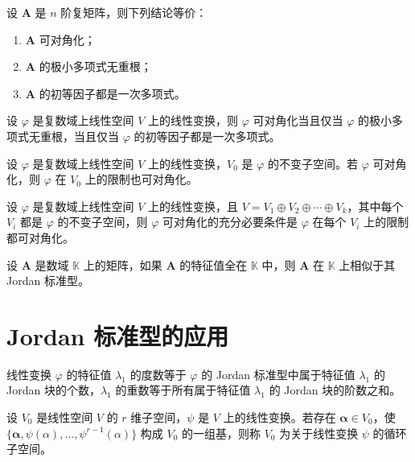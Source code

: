 \begin{corollary}
    设 $\bm{A}$ 是 $n$ 阶复矩阵，则下列结论等价：
    \begin{enumerate}
        \item $\bm{A}$ 可对角化；
        \item $\bm{A}$ 的极小多项式无重根；
        \item $\bm{A}$ 的初等因子都是一次多项式。
    \end{enumerate}
\end{corollary}

\begin{corollary}
    设 $\varphi$ 是复数域上线性空间 $V$ 上的线性变换，则 $\varphi$ 可对角化当且仅当 $\varphi$ 的极小多项式无重根，当且仅当 $\varphi$ 的初等因子都是一次多项式。
\end{corollary}

\begin{corollary}
    设 $\varphi$ 是复数域上线性空间 $V$ 上的线性变换，$V_0$ 是 $\varphi$ 的不变子空间。若 $\varphi$ 可对角化，则 $\varphi$ 在 $V_0$ 上的限制也可对角化。
\end{corollary}

\begin{corollary}
    设 $\varphi$ 是复数域上线性空间 $V$ 上的线性变换，且 $V = V_1 \oplus V_2 \oplus \cdots \oplus V_k$，其中每个 $V_i$ 都是 $\varphi$ 的不变子空间，则 $\varphi$ 可对角化的充分必要条件是 $\varphi$ 在每个 $V_i$ 上的限制都可对角化。
\end{corollary}

\begin{corollary}
    设 $\bm{A}$ 是数域 $\mathbb{K}$ 上的矩阵，如果 $\bm{A}$ 的特征值全在 $\mathbb{K}$ 中，则 $\bm{A}$ 在 $\mathbb{K}$ 上相似于其 Jordan 标准型。
\end{corollary}


\section{Jordan 标准型的应用}

\begin{theorem}
    线性变换 $\varphi$ 的特征值 $\lambda_1$ 的度数等于 $\varphi$ 的 Jordan 标准型中属于特征值 $\lambda_1$ 的 Jordan 块的个数，$\lambda_1$ 的重数等于所有属于特征值 $\lambda_1$ 的 Jordan 块的阶数之和。
\end{theorem}

\begin{definition}
    设 $V_0$ 是线性空间 $V$ 的 $r$ 维子空间，$\psi$ 是 $V$ 上的线性变换。若存在 $\bm{\alpha} \in V_0$，使 $\{\bm{\alpha}, \psi(\alpha), \ldots, \psi^{r - 1}(\alpha)\}$ 构成 $V_0$ 的一组基，则称 $V_0$ 为关于线性变换 $\psi$ 的循环子空间。
\end{definition}

